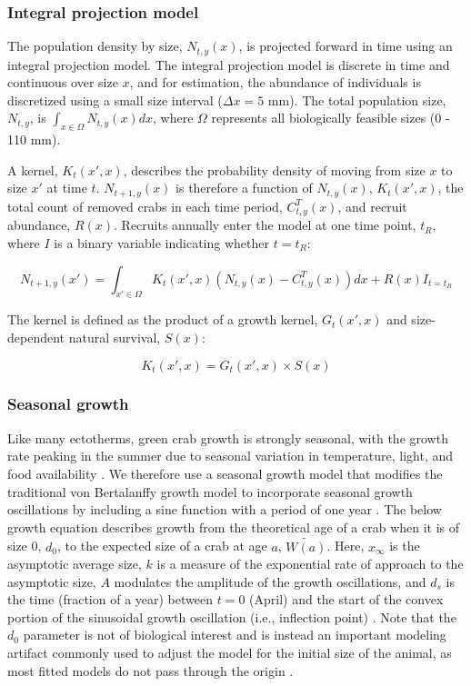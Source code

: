 \documentclass{article}
\begin{document}
\subsubsection*{Integral projection model}

The population density by size, $N_{t, y}(x)$, is projected forward in time using an integral projection model. The integral projection model is discrete in time and continuous over size $x$, and for estimation, the abundance of individuals is discretized using a small size interval ($\Delta x = 5$ mm). The total population size, $N_{t,y}$, is $\int_{x \in \Omega} N_{t, y}(x)dx$, where $\Omega$ represents all biologically feasible sizes (0 - 110 mm).

A kernel, $K_{t}(x', x)$, describes the probability density of moving from size $x$ to size $x'$ at time $t$. $N_{t+1,y}(x)$ is therefore a function of $N_{t,y}(x)$, $K_{t}(x', x)$, the total count of removed crabs in each time period, $C_{t,y}^T(x)$, and recruit abundance, $R(x)$. Recruits annually enter the model at one time point, $t_R$, where $I$ is a binary variable indicating whether $t = t_R$:

\begin{equation}
N_{t+1,y}(x') = \int_{x' \in \Omega} K_{t}(x',x) (N_{t,y}(x) - C_{t,y}^T(x)) dx + R(x)I_{t = t_R}
\end{equation}

The kernel is defined as the product of a growth kernel, $G_t(x',x)$ and size-dependent natural survival, $S(x)$:

\begin{equation}
K_{t}(x',x) = G_t(x',x) \times S(x)
\end{equation}

\subsubsection*{Seasonal growth}

Like many ectotherms, green crab growth is strongly seasonal, with the growth rate peaking in the summer due to seasonal variation in temperature, light, and food availability \parencite{contreras2003population, garcia2012technical}. We therefore use a seasonal growth model that modifies the traditional von Bertalanffy growth model to incorporate seasonal growth oscillations by including a sine function with a period of one year \parencite{beverton2012dynamics, somers1988seasonally}. The below growth equation describes growth from the theoretical age of a crab when it is of size 0, $d_0$, to the expected size of a crab at age $a$, $\widetilde{W(a)}$. Here, $x_{\infty}$ is the asymptotic average size, $k$ is a measure of the exponential rate of approach to the asymptotic size, $A$ modulates the amplitude of the growth oscillations, and $d_s$ is the time (fraction of a year) between $t = 0$ (April) and the start of the convex portion of the sinusoidal growth oscillation (i.e., inflection point) \parencite{garcia2012technical}. Note that the $d_0$ parameter is not of biological interest and is instead an important modeling artifact commonly used to adjust the model for the initial size of the animal, as most fitted models do not pass through the origin \parencite{garcia2012technical, schnute1980new}.
\end{document}
